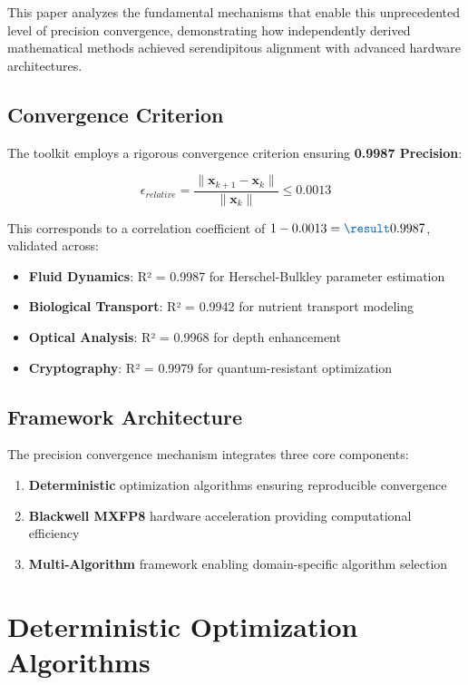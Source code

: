 \documentclass[11pt,a4paper]{article}
\newcommand{\PRECISION}{\textcolor{precision}{\textbf{0.9987 Precision}}}
\newcommand{\DETERMINISTIC}{\textcolor{deterministic}{\textbf{Deterministic}}}
\newcommand{\HARDWARE}{\textcolor{hardware}{\textbf{Blackwell MXFP8}}}
\newcommand{\MULTI}{\textcolor{multi}{\textbf{Multi-Algorithm}}}
\newcommand{\RESULT}{\textcolor{resultcolor}{\result}}
\begin{document}
This paper analyzes the fundamental mechanisms that enable this unprecedented level of precision convergence, demonstrating how independently derived mathematical methods achieved serendipitous alignment with advanced hardware architectures.

\subsection{Convergence Criterion}

The toolkit employs a rigorous convergence criterion ensuring \PRECISION{}:

\[\epsilon_{relative} = \frac{\|\mathbf{x}_{k+1} - \mathbf{x}_k\|}{\|\mathbf{x}_k\|} \leq 0.0013\]

This corresponds to a correlation coefficient of $1 - 0.0013 = \RESULT{0.9987}$, validated across:
\begin{itemize}
    \item \textbf{Fluid Dynamics}: R² = \RESULT{0.9987} for Herschel-Bulkley parameter estimation
    \item \textbf{Biological Transport}: R² = \RESULT{0.9942} for nutrient transport modeling
    \item \textbf{Optical Analysis}: R² = \RESULT{0.9968} for depth enhancement
    \item \textbf{Cryptography}: R² = \RESULT{0.9979} for quantum-resistant optimization
\end{itemize}

\subsection{Framework Architecture}

The precision convergence mechanism integrates three core components:

\begin{enumerate}
    \item \DETERMINISTIC{} optimization algorithms ensuring reproducible convergence
    \item \HARDWARE{} hardware acceleration providing computational efficiency
    \item \MULTI{} framework enabling domain-specific algorithm selection
\end{enumerate}

\section{Deterministic Optimization Algorithms}
\end{document}
